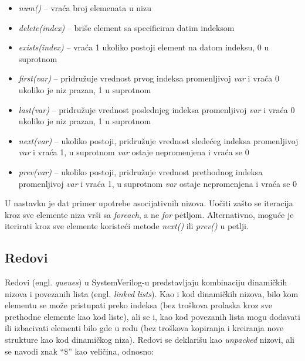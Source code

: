 \begin{itemize}
\item \emph{num()} – vraća broj elemenata u nizu
\item \emph{delete(index)} – briše element sa specificiran datim indeksom
\item \emph{exists(index)} – vraća 1 ukoliko postoji element na datom indeksu, 0
  u suprotnom
\item \emph{first(var)} – pridružuje vrednost prvog indeksa promenljivoj
  \emph{var} i vraća 0 ukoliko je niz prazan, 1 u suprotnom
\item \emph{last(var)} – pridružuje vrednost poslednjeg indeksa promenljivoj
  \emph{var} i vraća 0 ukoliko je niz prazan, 1 u suprotnom
\item \emph{next(var)} – ukoliko postoji, pridružuje vrednost sledećeg indeksa
  promenljivoj \emph{var} i vraća 1, u suprotnom \emph{var} ostaje nepromenjena
  i vraća se 0
\item \emph{prev(var)} – ukoliko postoji, pridružuje vrednost prethodnog indeksa
  promenljivoj \emph{var} i vraća 1, u suprotnom \emph{var} ostaje nepromenjena
  i vraća se 0
\end{itemize}

U nastavku je dat primer upotrebe asocijativnih nizova. Uočiti zašto se
iteracija kroz sve elemente niza vrši sa \emph{foreach}, a ne \emph{for}
petljom. Alternativno, moguće je iterirati kroz sve elemente koristeći metode
\emph{next()} ili \emph{prev()} u petlji.




\subsection{Redovi}

Redovi (engl. \emph{queues}) u SystemVerilog-u predstavljaju kombinaciju
dinamičkih nizova i povezanih lista (engl. \emph{linked lists}).
Kao i kod dinamičkih nizova, bilo kom elementu se može pristupati preko indeksa
(bez troškova prolaska kroz sve prethodne elemente kao kod liste), ali se i, kao
kod povezanih lista mogu dodavati ili izbacivati elementi bilo gde u redu (bez
troškova kopiranja i kreiranja nove strukture kao kod dinamičkog niza).
Redovi se deklarišu kao \emph{unpacked} nizovi, ali se navodi znak ``\(\$\)''
kao veličina, odnosno:

